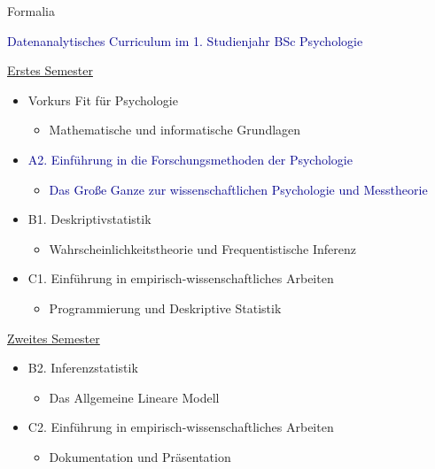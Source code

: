 \documentclass[
  8pt,
  ignorenonframetext,
]{beamer}
\providecommand{\tightlist}{%
  \setlength{\itemsep}{0pt}\setlength{\parskip}{0pt}}
\begin{document}
\begin{frame}{Formalia}
\protect\hypertarget{formalia-2}{}
\vspace{2mm}

\textcolor{darkblue}{Datenanalytisches Curriculum im 1. Studienjahr BSc Psychologie}
\small {}

\underline{Erstes Semester}

\begin{itemize}
\tightlist
\item
  Vorkurs Fit für Psychologie

  \begin{itemize}
  \tightlist
  \item
    \small Mathematische und informatische Grundlagen
  \end{itemize}
\item
  \textcolor{darkblue}{A2. Einführung in die Forschungsmethoden der Psychologie}

  \begin{itemize}
  \tightlist
  \item
    \small \textcolor{darkblue}{Das Große Ganze zur wissenschaftlichen Psychologie und Messtheorie}
  \end{itemize}
\item
  B1. Deskriptivstatistik

  \begin{itemize}
  \tightlist
  \item
    \small Wahrscheinlichkeitstheorie und Frequentistische Inferenz
  \end{itemize}
\item
  C1. Einführung in empirisch-wissenschaftliches Arbeiten

  \begin{itemize}
  \tightlist
  \item
    \small Programmierung und Deskriptive Statistik
  \end{itemize}
\end{itemize}

\vspace{-1mm}

\underline{Zweites Semester}

\begin{itemize}
\tightlist
\item
  B2. Inferenzstatistik

  \begin{itemize}
  \tightlist
  \item
    \small Das Allgemeine Lineare Modell
  \end{itemize}
\item
  C2. Einführung in empirisch-wissenschaftliches Arbeiten

  \begin{itemize}
  \tightlist
  \item
    \small Dokumentation und Präsentation
  \end{itemize}
\end{itemize}
\end{frame}
\end{document}
